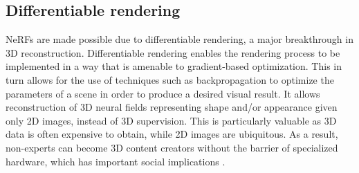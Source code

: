 
\subsection{Differentiable rendering} 
NeRFs are made possible due to differentiable rendering, a major breakthrough in 3D reconstruction. Differentiable rendering enables the rendering process to be implemented in a way that is amenable to gradient-based optimization. This in turn allows for the use of techniques such as backpropagation to optimize the parameters of a scene in order to produce a desired visual result. It allows reconstruction of 3D neural fields representing shape and/or appearance given only 2D images, instead of 3D supervision. This is particularly valuable as 3D data is often expensive to obtain, while 2D images are ubiquitous. As a result, non-experts can become 3D content creators without the barrier of specialized hardware, which has important social implications \cite{xie_neural_2022}.





